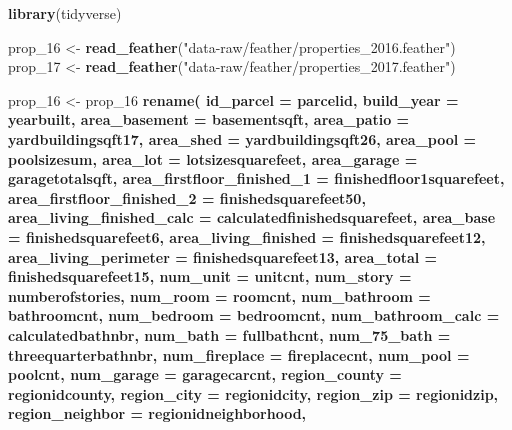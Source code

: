 \documentclass[]{book}
\newenvironment{Shaded}{\begin{snugshade}}{\end{snugshade}}
\newcommand{\KeywordTok}[1]{\textcolor[rgb]{0.13,0.29,0.53}{\textbf{#1}}}
\newcommand{\DataTypeTok}[1]{\textcolor[rgb]{0.13,0.29,0.53}{#1}}
\newcommand{\DecValTok}[1]{\textcolor[rgb]{0.00,0.00,0.81}{#1}}
\newcommand{\StringTok}[1]{\textcolor[rgb]{0.31,0.60,0.02}{#1}}
\newcommand{\OperatorTok}[1]{\textcolor[rgb]{0.81,0.36,0.00}{\textbf{#1}}}
\newcommand{\NormalTok}[1]{#1}
\theoremstyle{definition}
\theoremstyle{definition}
\theoremstyle{definition}
\theoremstyle{remark}
\begin{document}
\begin{Shaded}
\begin{Highlighting}[]
\KeywordTok{library}\NormalTok{(tidyverse)}

\NormalTok{prop_}\DecValTok{16}\NormalTok{ <-}\StringTok{ }\KeywordTok{read_feather}\NormalTok{(}\StringTok{"data-raw/feather/properties_2016.feather"}\NormalTok{)}
\NormalTok{prop_}\DecValTok{17}\NormalTok{ <-}\StringTok{ }\KeywordTok{read_feather}\NormalTok{(}\StringTok{"data-raw/feather/properties_2017.feather"}\NormalTok{)}

\NormalTok{prop_}\DecValTok{16}\NormalTok{ <-}\StringTok{ }\NormalTok{prop_}\DecValTok{16} \OperatorTok{%
\StringTok{  }\KeywordTok{rename}\NormalTok{(}
    \DataTypeTok{id_parcel =}\NormalTok{ parcelid,}
    \DataTypeTok{build_year =}\NormalTok{ yearbuilt,}
    \DataTypeTok{area_basement =}\NormalTok{ basementsqft,}
    \DataTypeTok{area_patio =}\NormalTok{ yardbuildingsqft17,}
    \DataTypeTok{area_shed =}\NormalTok{ yardbuildingsqft26, }
    \DataTypeTok{area_pool =}\NormalTok{ poolsizesum,  }
    \DataTypeTok{area_lot =}\NormalTok{ lotsizesquarefeet, }
    \DataTypeTok{area_garage =}\NormalTok{ garagetotalsqft,}
    \DataTypeTok{area_firstfloor_finished_1 =}\NormalTok{ finishedfloor1squarefeet,}
    \DataTypeTok{area_firstfloor_finished_2 =}\NormalTok{ finishedsquarefeet50,}
    \DataTypeTok{area_living_finished_calc =}\NormalTok{ calculatedfinishedsquarefeet,}
    \DataTypeTok{area_base =}\NormalTok{ finishedsquarefeet6,}
    \DataTypeTok{area_living_finished =}\NormalTok{ finishedsquarefeet12,}
    \DataTypeTok{area_living_perimeter =}\NormalTok{ finishedsquarefeet13,}
    \DataTypeTok{area_total =}\NormalTok{ finishedsquarefeet15,  }
    \DataTypeTok{num_unit =}\NormalTok{ unitcnt, }
    \DataTypeTok{num_story =}\NormalTok{ numberofstories,  }
    \DataTypeTok{num_room =}\NormalTok{ roomcnt,}
    \DataTypeTok{num_bathroom =}\NormalTok{ bathroomcnt,}
    \DataTypeTok{num_bedroom =}\NormalTok{ bedroomcnt,}
    \DataTypeTok{num_bathroom_calc =}\NormalTok{ calculatedbathnbr,}
    \DataTypeTok{num_bath =}\NormalTok{ fullbathcnt,  }
    \DataTypeTok{num_75_bath =}\NormalTok{ threequarterbathnbr, }
    \DataTypeTok{num_fireplace =}\NormalTok{ fireplacecnt,}
    \DataTypeTok{num_pool =}\NormalTok{ poolcnt,  }
    \DataTypeTok{num_garage =}\NormalTok{ garagecarcnt,  }
    \DataTypeTok{region_county =}\NormalTok{ regionidcounty,}
    \DataTypeTok{region_city =}\NormalTok{ regionidcity,}
    \DataTypeTok{region_zip =}\NormalTok{ regionidzip,}
    \DataTypeTok{region_neighbor =}\NormalTok{ regionidneighborhood,  }
}
\end{Highlighting}
\end{Shaded}
\end{document}
